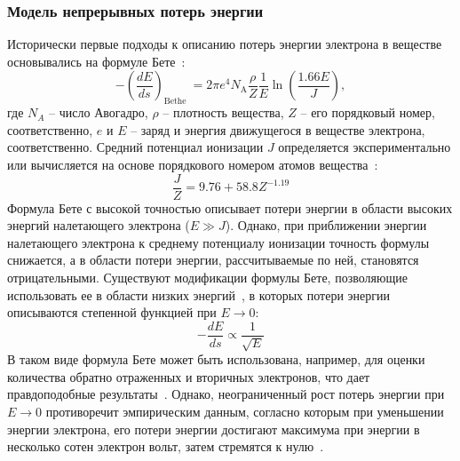 \subsubsection{Модель непрерывных потерь энергии}
Исторически первые подходы к описанию потерь энергии электрона в веществе основывались на формуле Бете~\cite{Bethe}:
\begin{equation}
	-\left(\frac{d E}{d s}\right)_{\text {Bethe }}=2 \pi e^4 N_{\mathrm{A}} \frac{\rho}{Z} \frac{1}{E} \ln \left(\frac{1.66 E}{J}\right),
\end{equation}
где $N_A$ -- число Авогадро, $\rho$ -- плотность вещества, $Z$ -- его порядковый номер, соответственно, $e$ и $E$ -- заряд и энергия движущегося в веществе электрона, соответственно. Средний потенциал ионизации $J$ определяется экспериментально или вычисляется на основе порядкового номером атомов вещества~\cite{Dapor_large_book}:
\begin{equation}
	\frac{J}{Z}=9.76+58.8 Z^{-1.19}
\end{equation}
Формула Бете с высокой точностью описывает потери энергии в области высоких энергий налетающего электрона ($E \gg J$). Однако, при приближении энергии налетающего электрона к среднему потенциалу ионизации точность формулы снижается, а в области потери энергии, рассчитываемые по ней, становятся отрицательными. Существуют модификации формулы Бете, позволяющие использовать ее в области низких энергий~\cite{Bethe_corrected}, в которых потери энергии описываются степенной функцией при $E \rightarrow 0$:
\begin{equation}
	-\frac{dE}{ds} \propto \frac{1}{\sqrt{E}}
\end{equation}
В таком виде формула Бете может быть использована, например, для оценки количества обратно отраженных и вторичных электронов, что дает правдоподобные результаты~\cite{Bethe_corr_2ndary_e}. Однако, неограниченный рост потерь энергии при $E \rightarrow 0$ противоречит эмпирическим данным, согласно которым при уменьшении энергии электрона, его потери энергии достигают максимума при энергии в несколько сотен электрон вольт, затем стремятся к нулю~\cite{Shimizu_Review}.


